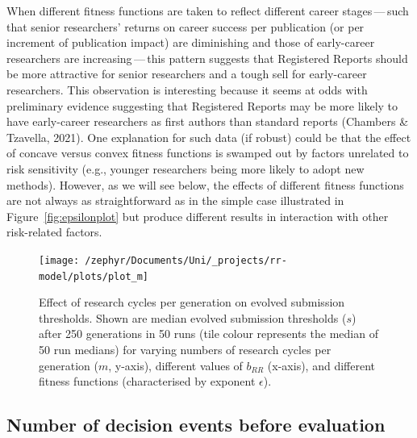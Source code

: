 \documentclass[british,,doc,mask,floatsintext]{apa6}
\begin{document}
When different fitness functions are taken to reflect different career stages\(\,\)---\(\,\)such that senior researchers' returns on career success per publication (or per increment of publication impact) are diminishing and those of early-career researchers are increasing\(\,\)---\(\,\)this pattern suggests that Registered Reports should be more attractive for senior researchers and a tough sell for early-career researchers.
This observation is interesting because it seems at odds with preliminary evidence suggesting that Registered Reports may be more likely to have early-career researchers as first authors than standard reports (Chambers \& Tzavella, 2021).
One explanation for such data (if robust) could be that the effect of concave versus convex fitness functions is swamped out by factors unrelated to risk sensitivity (e.g., younger researchers being more likely to adopt new methods).
However, as we will see below, the effects of different fitness functions are not always as straightforward as in the simple case illustrated in Figure~\ref{fig:epsilonplot} but produce different results in interaction with other risk-related factors.



\begin{figure}
\texttt{[image: /zephyr/Documents/Uni/\_projects/rr-model/plots/plot\_m]} \caption{Effect of research cycles per generation on evolved submission thresholds. Shown are median evolved submission thresholds (\(s\)) after 250 generations in 50 runs (tile colour represents the median of 50 run medians) for varying numbers of research cycles per generation (\(m\), y-axis), different values of \(b_{RR}\) (x-axis), and different fitness functions (characterised by exponent \(\epsilon\)).}\label{fig:mplot}
\end{figure}

\hypertarget{number-of-decision-events-before-evaluation-1}{%
\subsection{Number of decision events before evaluation}\label{number-of-decision-events-before-evaluation-1}}
\end{document}
